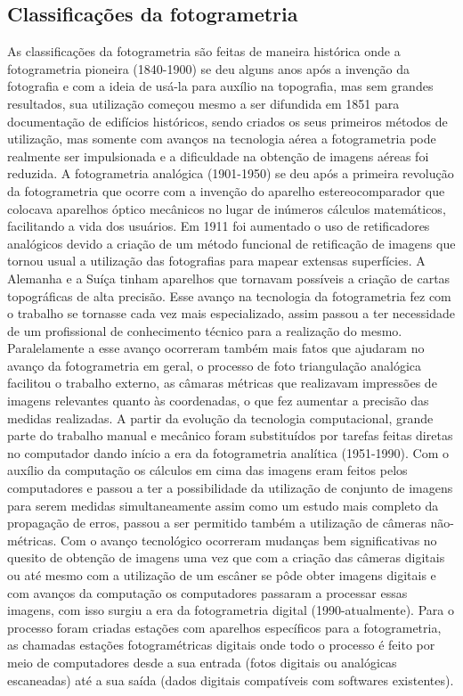 \subsection{Classificações da fotogrametria}
As classificações da fotogrametria são feitas de maneira histórica onde a fotogrametria pioneira (1840-1900) se deu alguns anos após a invenção da fotografia e com a ideia de usá-la para auxílio na topografia, mas sem grandes resultados, sua utilização começou mesmo a ser difundida em 1851 para documentação de edifícios históricos, sendo criados os seus primeiros métodos de utilização, mas somente com avanços na tecnologia aérea a fotogrametria pode realmente ser impulsionada e a dificuldade na obtenção de imagens aéreas foi reduzida. 
A fotogrametria analógica (1901-1950) se deu após a primeira revolução da fotogrametria que ocorre com a invenção do aparelho estereocomparador que colocava aparelhos óptico mecânicos no lugar de inúmeros cálculos matemáticos, facilitando a vida dos usuários. Em 1911 foi aumentado o uso de retificadores analógicos devido a criação de um método funcional de retificação de imagens que tornou usual a utilização das fotografias para mapear extensas superfícies. A Alemanha e a Suíça tinham aparelhos que tornavam possíveis a criação de cartas topográficas de alta precisão. Esse avanço na tecnologia da fotogrametria fez com o trabalho se tornasse cada vez mais especializado, assim passou a ter necessidade de um profissional de conhecimento técnico para a realização do mesmo. Paralelamente a esse avanço ocorreram também mais fatos que ajudaram no avanço da fotogrametria em geral, o processo de foto triangulação analógica facilitou o trabalho externo, as câmaras métricas que realizavam impressões de imagens relevantes quanto às coordenadas, o que fez aumentar a precisão das medidas realizadas.
A partir da evolução da tecnologia computacional, grande parte do trabalho manual e mecânico foram substituídos por tarefas feitas diretas no computador dando início a era da fotogrametria analítica (1951-1990). Com o auxílio da computação os cálculos em cima das imagens eram feitos pelos computadores e passou a ter a possibilidade da utilização de conjunto de imagens para serem medidas simultaneamente assim como um estudo mais completo da propagação de erros, passou a ser permitido também a utilização de câmeras não-métricas.
Com o avanço tecnológico ocorreram mudanças bem significativas no quesito de obtenção de imagens uma vez que com a criação das câmeras digitais ou até mesmo com a utilização de um escâner se pôde obter imagens digitais e com avanços da computação os computadores passaram a processar essas imagens, com isso surgiu a era da fotogrametria digital (1990-atualmente). Para o processo foram criadas estações com aparelhos específicos para a fotogrametria, as chamadas estações fotogramétricas digitais onde todo o processo é feito por meio de computadores desde a sua entrada (fotos digitais ou analógicas escaneadas) até a sua saída (dados digitais compatíveis com softwares existentes).

